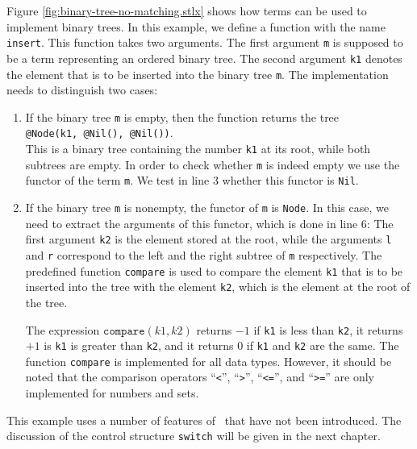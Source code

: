 Figure \ref{fig:binary-tree-no-matching.stlx} shows how terms can be used to implement
binary trees.  In this example, we define a function with the name \texttt{insert}.  This function
takes two arguments.  The first argument \texttt{m} is supposed to be a term representing an ordered binary
tree.  The second argument \texttt{k1} denotes the element that is to be inserted into the binary
tree \texttt{m}.   The implementation needs to distinguish two cases:
\begin{enumerate}
\item If the binary tree \texttt{m} is empty, then the function returns the tree
      \\[0.2cm]
      \hspace*{1.3cm}
      \texttt{@Node(k1, @Nil(), @Nil())}.
      \\[0.2cm]
      This is a binary tree containing the number \texttt{k1} at its root, while both subtrees are
      empty.  In order to check whether \texttt{m} is indeed empty we use the functor of the term
      \texttt{m}.  We test in line  3 whether this functor is \texttt{Nil}.
\item If the binary tree \texttt{m} is nonempty, the functor of \texttt{m} is
      \texttt{Node}.  In this case, we need to extract the arguments of this
      functor, which is done in line 6: The first argument \texttt{k2} is the element stored at the
      root, while the arguments \texttt{l} and \texttt{r} correspond to the left and the right
      subtree of \texttt{m} respectively.  The predefined function \texttt{compare} is used to
      compare the element \texttt{k1} that is to be inserted into the tree with the element
      \texttt{k2}, which is the element at the root of the tree.

      The expression $\texttt{compare}(k1, k2)$ returns $-1$ if \texttt{k1} is less than
      \texttt{k2}, it returns $+1$ is \texttt{k1} is greater than \texttt{k2}, and it returns $0$
      if \texttt{k1} and \texttt{k2} are the same.  The function \texttt{compare} is implemented for
      all data types.  However, it should be noted that the comparison operators ``\texttt{<}'', ``\texttt{>}'',
      ``\texttt{<=}'', and ``\texttt{>=}'' are only implemented for numbers and sets.
\end{enumerate}
This example uses a number of features of \setlx\ that have not been introduced. The discussion of
the control structure \texttt{switch} will be given in the next chapter.


